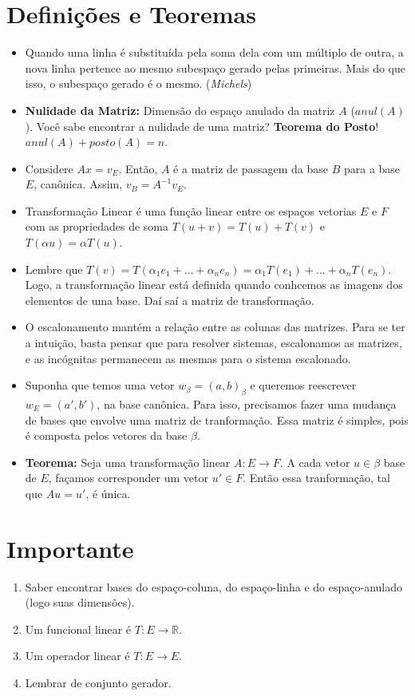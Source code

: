 \documentclass[12pt,letterpaper]{article}
\begin{document}
\section*{Definições e Teoremas}
\begin{itemize}
    \item Quando uma linha é substituída pela soma dela com um múltiplo de outra, a nova linha pertence ao mesmo subespaço gerado pelas primeiras. Mais do que isso, o subespaço gerado é o mesmo. (\textit{Michels})
    \item \textbf{Nulidade da Matriz: }Dimensão do espaço anulado da matriz $A$ ($anul(A)$). Você sabe encontrar a nulidade de uma matriz? \textbf{Teorema do Posto}! $anul(A) + posto(A) = n$.
    \item Considere $Ax = v_E$. Então, $A$ é a matriz de passagem da base $B$ para a base $E$, canônica. Assim, $v_B = A^{-1}v_E$. 
    \item Transformação Linear é uma função linear entre os espaços vetorias $E$ e $F$  com as propriedades de soma $T(u+v)=T(u)+T(v)$ e $T(\alpha u) = \alpha T(u)$.
    \item Lembre que $T(v) = T(\alpha_1 e_1 + ... + \alpha_n e_n) = \alpha_1 T(e_1) + ... + \alpha_n T(e_n)$. Logo, a transformação linear está definida quando conhcemos as imagens dos elementos de uma base. Daí saí a matriz de transformação.
    \item O escalonamento mantém a relação entre as colunas das matrizes. Para se ter a intuição, basta pensar que para resolver sistemas, escalonamos as matrizes, e as incógnitas permanecem as mesmas para o sistema escalonado.
    \item Suponha que temos uma vetor $w_\beta = (a,b)_\beta$ e queremos reescrever $w_E = (a',b')$, na base canônica. Para isso, precisamos fazer uma mudança de bases que envolve uma matriz de tranformação. Essa matriz é simples, pois é composta pelos vetores da base $\beta$. 
    \item \textbf{Teorema:} Seja uma transformação linear $A: E \to F$. A cada vetor $u \in \beta$ base de $E$, façamos corresponder um vetor $u' \in F$. Então essa tranformação, tal que $Au = u'$, é única. 
    \end{itemize}

\section*{Importante}
\begin{enumerate}
    \item Saber encontrar bases do espaço-coluna, do espaço-linha e do espaço-anulado (logo suas dimensões).
    \item Um funcional linear é $T: E \to \mathbb{R}$.
    \item Um operador linear é $T: E \to E$. 
    \item Lembrar de conjunto gerador. 
\end{enumerate}
\end{document}
